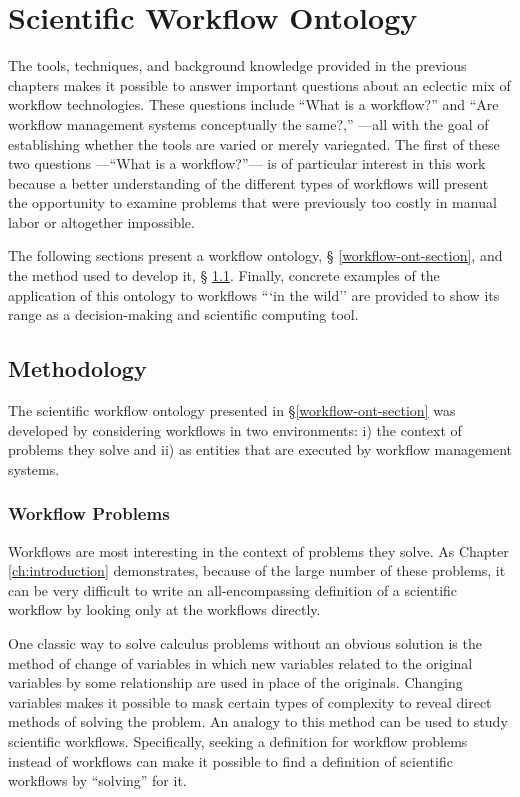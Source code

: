 \chapter{Scientific Workflow Ontology}
\label{ch:workflow-ontology}

The tools, techniques, and background knowledge provided in the previous
chapters makes it possible to answer important questions about an eclectic mix
of workflow technologies. These questions include ``What is a workflow?'' and
``Are workflow management systems conceptually the same?,'' ---all with the goal
of establishing whether the tools are varied or merely variegated. The first of
these two questions ---``What is a workflow?''--- is of particular interest in
this work because a better understanding of the different types of workflows will
present the opportunity to examine problems that were previously too costly in
manual labor or altogether impossible.

The following sections present a workflow ontology, \S
\ref{workflow-ont-section}, and the method used to develop it, \S
\ref{workflow-ont-method}. Finally, concrete examples of the application of this
ontology to workflows ```in the wild'' are provided to show its range as a
decision-making and scientific computing tool.

\section{Methodology}
\label{workflow-ont-method}


The scientific workflow ontology presented in \S \ref{workflow-ont-section} was
developed by considering workflows in two environments: i) the context
of problems they solve and ii) as entities that are executed by workflow
management systems.

\subsection{Workflow Problems}

Workflows are most interesting in the context of problems they solve. As
Chapter \ref{ch:introduction} demonstrates, because of the large number of these
problems, it can be very difficult to write an all-encompassing
definition of a scientific workflow by looking only at the workflows directly. 

One classic way to solve calculus problems without an obvious solution is the
method of change of variables in which new variables related to the original
variables by some relationship are used in place of the originals. Changing
variables makes it possible to mask certain types of complexity to reveal direct
methods of solving the problem. An analogy to this method can be used to study
scientific workflows. Specifically, seeking a definition for workflow problems
instead of workflows can make it possible to find a definition of scientific
workflows by ``solving'' for it. 


